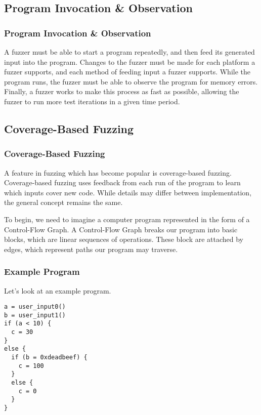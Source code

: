 \documentclass{beamer}
\begin{document}
\subsection{Program Invocation {\&} Observation}
\begin{frame}
\frametitle{Program Invocation {\&} Observation}
A fuzzer must be able to start a program repeatedly, and then feed its generated input into the program. Changes to the fuzzer must be made for each platform a fuzzer supports, and each method of feeding input a fuzzer supports. While the program runs, the fuzzer must be able to observe the program for memory errors. Finally, a fuzzer works to make this process as fast as possible, allowing the fuzzer to run more test iterations in a given time period.
\end{frame}


\subsection{Coverage-Based Fuzzing}
\begin{frame}
\frametitle{Coverage-Based Fuzzing}
A feature in fuzzing which has become popular is coverage-based fuzzing. Coverage-based fuzzing uses feedback from each run of the program to learn which inputs cover new code. While details may differ between implementation, the general concept remains the same.

To begin, we need to imagine a computer program represented in the form of a Control-Flow Graph. A Control-Flow Graph breaks our program into basic blocks, which are linear sequences of operations. These block are attached by edges, which represent paths our program may traverse.
\end{frame}


\begin{frame}[fragile]
\frametitle{Example Program}
Let's look at an example program.
\begin{lstlisting}[breaklines=false]
a = user_input0()
b = user_input1()
if (a < 10) {
  c = 30
}
else {
  if (b = 0xdeadbeef) {
    c = 100
  }
  else {
    c = 0
  }
}
\end{lstlisting}
\end{frame}
\end{document}
